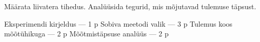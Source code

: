 
Määrata liivatera tihedus. Analüüsida tegurid, mis mõjutavad tulemuse täpsust.

\hint

\solu
Eksperimendi kirjeldus --- 1 p Sobiva meetodi valik --- 3 p Tulemus koos mõõtühikuga --- 2 p Mõõtmistäpsuse analüüs --- 2 p
\probend
